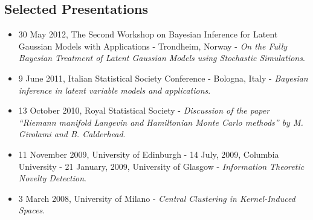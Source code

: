 \documentclass[a4paper,10pt]{article}
\begin{document}
\subsection*{Selected Presentations}
\begin{itemize}
\item 30 May 2012, The Second Workshop on Bayesian Inference for Latent Gaussian Models with Applications - Trondheim, Norway - \emph{On the Fully Bayesian Treatment of Latent Gaussian Models using Stochastic Simulations}.
\item 9 June 2011, Italian Statistical Society Conference - Bologna, Italy - \emph{Bayesian inference in latent variable models and applications}.
\item 13 October 2010, Royal Statistical Society - \emph{Discussion of the paper ``Riemann manifold Langevin and Hamiltonian Monte Carlo methods'' by M. Girolami and B. Calderhead}.
\item 11 November 2009, University of Edinburgh - 14 July, 2009, Columbia University - 21 January, 2009, University of Glasgow - \emph{Information Theoretic Novelty Detection}.
\item 3 March 2008, University of Milano - \emph{Central Clustering in Kernel-Induced Spaces}.
\end{itemize}

\end{document}
